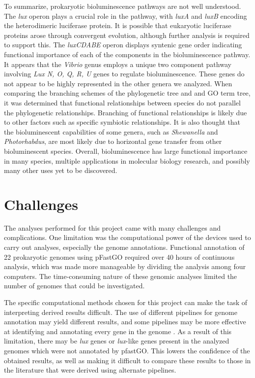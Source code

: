 \documentclass[fleqn,12pt]{wlscirep}
\begin{document}
To summarize, prokaryotic bioluminescence pathways are not well understood. The \textit{lux} operon plays a crucial role in the pathway, with \textit{luxA} and \textit{luxB} encoding the heterodimeric luciferase protein. It is possible that eukaryotic luciferase proteins arose through convergent evolution, although further analysis is required to support this. The \textit{luxCDABE} operon displays syntenic gene order indicating functional importance of each of the components in the bioluminescence pathway. It appears that the \textit{Vibrio} genus employs a unique two component pathway involving \textit{Lux N, O, Q, R, U} genes to regulate bioluminescence. These genes do not appear to be highly represented in the other genera we analyzed. When comparing the branching schemes of the phylogenetic tree and and GO term tree, it was determined that functional relationships between species do not parallel the phylogenetic relationships. Branching of functional relationships is likely due to other factors such as specific symbiotic relationships. It is also thought that the bioluminescent capabilities of some genera, such as \textit{Shewanella} and \textit{Photorhabdus}, are most likely due to horizontal gene transfer from other bioluminescent species. Overall, bioluminescence has large functional importance in many species, multiple applications in molecular biology research, and possibly many other uses yet to be discovered.


\section*{Challenges}

The analyses performed for this project came with many challenges and complications. One limitation was the computational power of the devices used to carry out analyses, especially the genome annotations. Functional annotation of 22 prokaryotic genomes using pFastGO required over 40 hours of continuous analysis, which was made more manageable by dividing the analysis among four computers. The time-consuming nature of these genomic analyses limited the number of genomes that could be investigated.

The specific computational methods chosen for this project can make the task of interpreting derived results difficult. The use of different pipelines for genome annotation may yield different results, and some pipelines may be more effective at identifying and annotating every gene in the genome \cite{t4}. As a result of this limitation, there may be \textit{lux} genes or \textit{lux}-like genes present in the analyzed genomes which were not annotated by pfastGO. This lowers the confidence of the obtained results, as well as making it difficult to compare these results to those in the literature that were derived using alternate pipelines.
\end{document}
